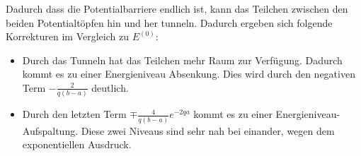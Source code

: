 Dadurch dass die Potentialbarriere endlich ist, kann das Teilchen zwischen den beiden Potentialtöpfen hin und her tunneln. Dadurch ergeben sich folgende Korrekturen im Vergleich zu \(E^{(0)}\):

\begin{itemize}
\item Durch das Tunneln hat das Teilchen mehr Raum zur Verfügung. Dadurch kommt es zu einer Energieniveau Absenkung. Dies wird durch den negativen Term \(-\frac{2}{q(b-a)} \)  deutlich.
\item Durch den letzten Term \(\mp\frac{4}{q(b-a)}e^{-2qa}   \) kommt es zu einer Energieniveau-Aufspaltung. Diese zwei Niveaus sind sehr nah bei einander, wegen dem exponentiellen Ausdruck.
\end{itemize}








